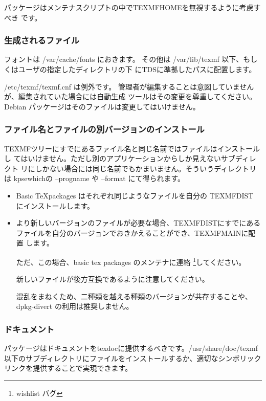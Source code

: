 \documentclass[mingoth,a4paper]{jsarticle}
\begin{document}
パッケージはメンテナスクリプトの中でTEXMFHOMEを無視するように考慮すべき
です。

\subsubsection{生成されるファイル}

フォントは /var/cache/fonts におきます。
その他は  /var/lib/texmf 以下、もしくはユーザの指定したディレクトリの下
にTDSに準拠したパスに配置します。

 /etc/texmf/texmf.cnf は例外です。
管理者が編集することは意図していませんが、編集されていた場合には自動生成
ツールはその変更を尊重してください。
Debian パッケージはそのファイルは変更してはいけません。

\subsubsection{ファイル名とファイルの別バージョンのインストール}

TEXMFツリーにすでにあるファイル名と同じ名前ではファイルはインストールし
てはいけません。ただし別のアプリケーションからしか見えないサブディレクト
リにしかない場合には同じ名前でもかまいません。そういうディレクトリは
kpsewhichの --progname や --format にて得られます。

\begin{itemize}
 \item Basic \TeX packages はそれぞれ同じようなファイルを自分の TEXMFDIST 
	にインストールします。
 \item より新しいバージョンのファイルが必要な場合、TEXMFDISTにすでにある
       ファイルを自分のバージョンでおきかえることができ、TEXMFMAINに配置
       します。

       ただ、この場合、basic tex packages のメンテナに連絡
       \footnote{wishlist バグ}してください。

       新しいファイルが後方互換であるように注意してください。

       混乱をまねくため、二種類を越える種類のバージョンが共存することや、
       dpkg-divert の利用は推奨しません。
\end{itemize}

\subsubsection{ドキュメント}

パッケージはドキュメントをtexdocに提供するべきです。/usr/share/doc/texmf 
以下のサブディレクトリにファイルをインストールするか、適切なシンボリック
リンクを提供することで実現できます。
\end{document}
